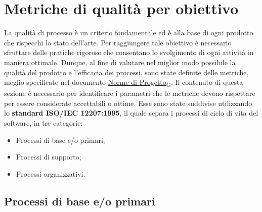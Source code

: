 \section{Metriche di qualità per obiettivo}
La qualità di processo è un criterio fondamentale ed è alla base di ogni prodotto che rispecchi lo stato dell'arte. Per raggiungere tale obiettivo è necessario sfruttare delle pratiche rigorose che consentano lo svolgimento di ogni attività in maniera ottimale. Dunque, al fine di valutare nel miglior modo possibile la qualità del prodotto e l'efficacia dei processi, sono state definite delle metriche, meglio specificate nel documento \href{https://7last.github.io/docs/rtb/documentazione-interna/glossario#norme-di-progetto}{Norme di Progetto\textsubscript{G}}. Il contenuto di questa sezione è necessario per identificare i parametri che le metriche devono rispettare per essere considerate accettabili o ottime. Esse sono state suddivise utilizzando lo \textbf{standard ISO/IEC 12207:1995}, il quale separa i processi di ciclo di vita del software, in tre categorie: %
\begin{itemize}
	\item Processi di base e/o primari;
	\item Processi di supporto;
	\item Processi organizzativi.
\end{itemize}

\subsection{Processi di base e/o primari}
